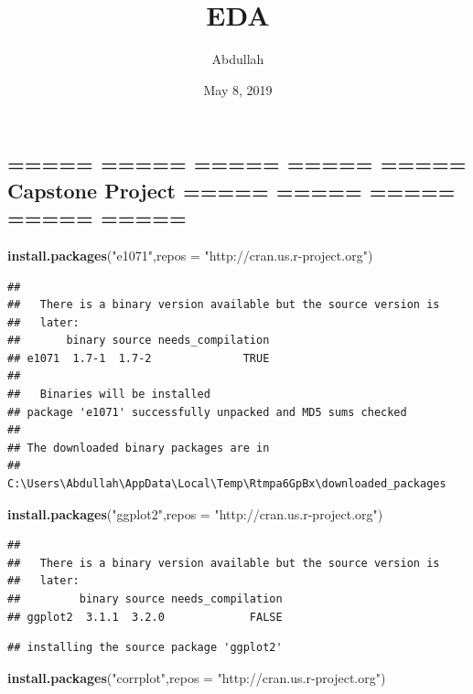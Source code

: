 \documentclass[]{article}
\title{EDA}
\author{Abdullah}
\date{May 8, 2019}
\newenvironment{Shaded}{\begin{snugshade}}{\end{snugshade}}
\newcommand{\KeywordTok}[1]{\textcolor[rgb]{0.13,0.29,0.53}{\textbf{#1}}}
\newcommand{\DataTypeTok}[1]{\textcolor[rgb]{0.13,0.29,0.53}{#1}}
\newcommand{\StringTok}[1]{\textcolor[rgb]{0.31,0.60,0.02}{#1}}
\newcommand{\NormalTok}[1]{#1}
\begin{document}
\maketitle

\subsection{===== ===== ===== ===== ===== Capstone Project ===== =====
===== ===== =====}\label{capstone-project}

\begin{Shaded}
\begin{Highlighting}[]
\KeywordTok{install.packages}\NormalTok{(}\StringTok{"e1071"}\NormalTok{,}\DataTypeTok{repos =} \StringTok{"http://cran.us.r-project.org"}\NormalTok{)}
\end{Highlighting}
\end{Shaded}

\begin{verbatim}
## 
##   There is a binary version available but the source version is
##   later:
##       binary source needs_compilation
## e1071  1.7-1  1.7-2              TRUE
## 
##   Binaries will be installed
## package 'e1071' successfully unpacked and MD5 sums checked
## 
## The downloaded binary packages are in
##  C:\Users\Abdullah\AppData\Local\Temp\Rtmpa6GpBx\downloaded_packages
\end{verbatim}

\begin{Shaded}
\begin{Highlighting}[]
\KeywordTok{install.packages}\NormalTok{(}\StringTok{"ggplot2"}\NormalTok{,}\DataTypeTok{repos =} \StringTok{"http://cran.us.r-project.org"}\NormalTok{)}
\end{Highlighting}
\end{Shaded}

\begin{verbatim}
## 
##   There is a binary version available but the source version is
##   later:
##         binary source needs_compilation
## ggplot2  3.1.1  3.2.0             FALSE
\end{verbatim}

\begin{verbatim}
## installing the source package 'ggplot2'
\end{verbatim}

\begin{Shaded}
\begin{Highlighting}[]
\KeywordTok{install.packages}\NormalTok{(}\StringTok{"corrplot"}\NormalTok{,}\DataTypeTok{repos =} \StringTok{"http://cran.us.r-project.org"}\NormalTok{)}
\end{Highlighting}
\end{Shaded}
\end{document}

